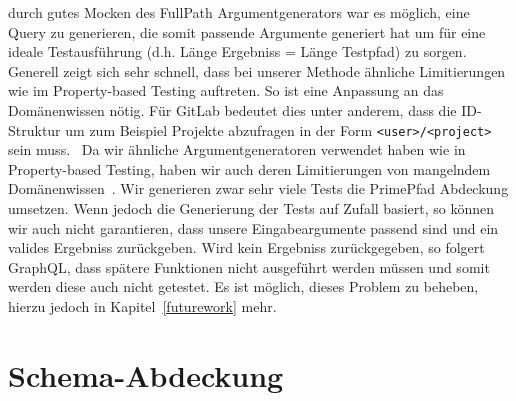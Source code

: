 durch gutes Mocken des FullPath Argumentgenerators war es möglich, eine Query zu generieren, die somit passende Argumente generiert hat um für eine ideale Testausführung (d.h. Länge Ergebniss = Länge Testpfad) zu sorgen.
Generell zeigt sich sehr schnell, dass bei unserer Methode ähnliche Limitierungen wie im Property-based Testing auftreten.
So ist eine Anpassung an das Domänenwissen nötig.
Für GitLab bedeutet dies unter anderem, dass die ID-Struktur um zum Beispiel Projekte abzufragen in der Form \verb+<user>/<project>+ sein muss.~\cite[vgl. S.8]{property-based-testing}
Da wir ähnliche Argumentgeneratoren verwendet haben wie in Property-based Testing, haben wir auch deren Limitierungen von mangelndem Domänenwissen~\cite[vgl. S.8]{property-based-testing}.
Wir generieren zwar sehr viele Tests die PrimePfad Abdeckung umsetzen.
Wenn jedoch die Generierung der Tests auf Zufall basiert, so können wir auch nicht garantieren, dass unsere Eingabeargumente passend sind und ein valides Ergebniss zurückgeben.
Wird kein Ergebniss zurückgegeben, so folgert GraphQL, dass spätere Funktionen nicht ausgeführt werden müssen und somit werden diese auch nicht getestet.
Es ist möglich, dieses Problem zu beheben, hierzu jedoch in Kapitel~\ref{futurework} mehr.

\section{Schema-Abdeckung}

